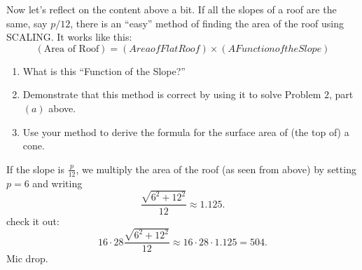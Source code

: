 \documentclass[hints,nooutcomes,noauthor,handout,12pt]{ximera}
\begin{document}
\mynewpage


\begin{question}
  Now let's reflect on the content above a bit. If all the slopes of a
  roof are the same, say $p/12$, there is an ``easy'' method of
  finding the area of the roof using SCALING. It works like this:
  \[
  (\text{Area of Roof}) = (Area of Flat Roof) \times (A Function of the Slope) 
  \]
  \begin{enumerate}
  \item What is this ``Function of the Slope?''
    \item Demonstrate that this method is correct by using it to solve
      Problem $2$, part $(a)$ above.
    \item Use your method to derive the formula for the surface area
      of (the top of) a cone. 
  \end{enumerate}
  \begin{freeResponse}
  If the slope is $\frac{p}{12}$, we multiply the area of the roof (as
  seen from above) by setting $p = 6$ and writing
    \[
    \frac{\sqrt{6^2+12^2}}{12} \approx 1.125.
    \]
    check it out:
    \[
    16\cdot 28 \frac{\sqrt{6^2+12^2}}{12} \approx 16\cdot 28 \cdot 1.125 = 504.
    \]
    Mic drop.
  \end{freeResponse}
\end{question}
\end{document}
